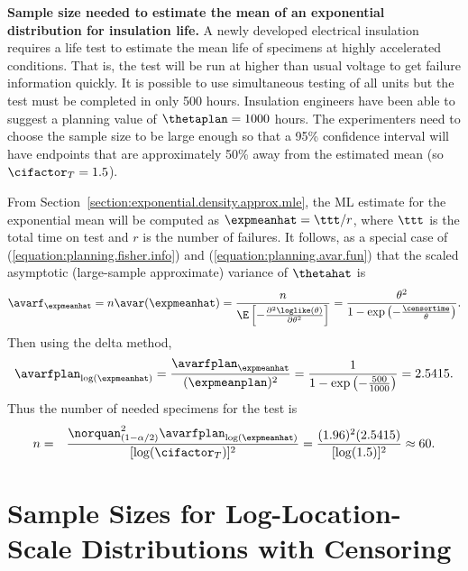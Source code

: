 \begin{example}
\label{example:exponential.insulation.sampsize}
{\bf Sample size needed to estimate the mean of an exponential
distribution for insulation life.} A newly developed electrical
insulation requires a life test to estimate the mean life of specimens
at highly accelerated conditions.  That is, the test will be run at
higher than usual voltage to get failure information quickly.  It is
possible to use simultaneous testing of all units but the test must be
completed in only 500 hours.  Insulation engineers have been able to
suggest a planning value of $\thetaplan=1000$ hours.  The
experimenters need to choose the sample size to be large enough so that a
95\% confidence interval will have endpoints that are approximately
50\% away from the estimated mean (so $\cifactor_{T}=1.5$).

From Section~\ref{section:exponential.density.approx.mle}, the ML
estimate for the exponential mean will be computed as
$\expmeanhat=\ttt/r$, where $\ttt$ is the total time on test and $r$
is the number of failures. It follows, as a special case of
(\ref{equation:planning.fisher.info}) and
(\ref{equation:planning.avar.fun}) that the scaled asymptotic
(large-sample approximate) variance of $\thetahat$ is
\begin{eqnarray*}
	\avarf_{\expmeanhat}= n \avar(\expmeanhat)=\frac{n}
	{\E \left [-\frac{\partial^{2}\loglike(\theta)}{\partial
	\theta^{2}} \right] } = \frac{\theta^{2}}{1-\exp\left
	(-\frac{\censortime}{\theta}\right )}.
\end{eqnarray*}
Then using the delta method,
\begin{eqnarray*}
	\avarfplan_{\log(\expmeanhat)}=
	\frac{\avarfplan_{\expmeanhat}}{ (\expmeanplan)^{2}}=
\frac{1}{1-\exp\left(-\frac{500}{1000}\right )}=2.5415.
\end{eqnarray*}
Thus the number of needed specimens for the test is
\begin{eqnarray*}
	n&=&\frac{\norquan_{(1-\alpha/2)}^{2} 
	\avarfplan_{\log(\expmeanhat)}}{[\log(\cifactor_{T})]^2}=
	\frac{(1.96)^{2}(2.5415)}{[\log(1.5)]^2} \approx 60.
\end{eqnarray*}
\end{example}
\section{Sample Sizes for Log-Location-Scale Distributions with Censoring}
\label{section:location.scale.single.censoring}
